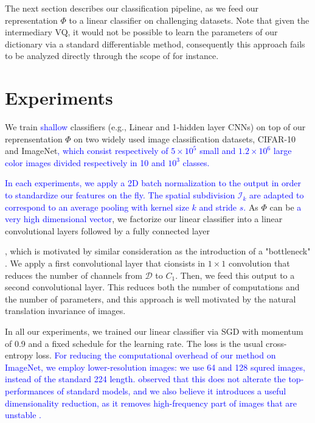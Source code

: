 \documentclass{article}
\newcommand{\Edouard}[1]{\textcolor{blue}{#1}}
\begin{document}
{The next section describes our classification pipeline, as we feed our representation $\Phi$ to a linear classifier on challenging datasets. Note that given the intermediary VQ, it would not be possible to learn the parameters of our dictionary via a standard differentiable method, consequently this approach fails to be analyzed directly through the scope of \cite{chizat2018global} for instance.




\section{Experiments}
\label{experiments}
We train  \Edouard{shallow} classifiers (e.g., Linear and 1-hidden layer CNNs) on top of our reprensentation $\Phi$ on two widely used image classification datasets,  CIFAR-10 and ImageNet\Edouard{, which consist respectively of $5\times10^5$ small and $1.2\times10^6$ large color images  divided respectively in 10 and $10^3$ classes.}


\Edouard{In each experiments, we apply a 2D batch normalization to the output \Edouard{in order to standardize our features on the fly}. The spatial subdivision $\mathcal{I}_k$ are adapted to correspond to an average pooling with kernel size $k$ and stride $s$. }As  $\Phi$ can be \Edouard{a very high dimensional vector}, we factorize our linear classifier into a linear convolutional layers followed by a fully connected layer}, which is motivated by similar consideration as the introduction of a "bottleneck" \cite{ResNet}. We apply a first convolutional layer that cionsists in $1\times 1$ convolution that reduces the number of channels from $\mathcal{D}$ to $C_1$. Then, we feed this output to a second convolutional layer.
This reduces both the number of computations and the number of parameters, and this approach is well motivated by the natural translation invariance of images.

In all our experiments, we trained our linear classifier via SGD with momentum of 0.9 and a fixed schedule for the learning rate.
The loss is the usual cross-entropy loss. \Edouard{ For reducing the computational overhead of our method on ImageNet, we employ lower-resolution images: we use 64 and 128 squred images, instead of the standard 224 length.  \cite{DBLP:journals/corr/ChrabaszczLH17} observed that this does not alterate the top-performances of standard models, and we also believe it introduces a useful dimensionality reduction, as it removes high-frequency part of images that are unstable \citet{chjdq}.} 
\end{document}
